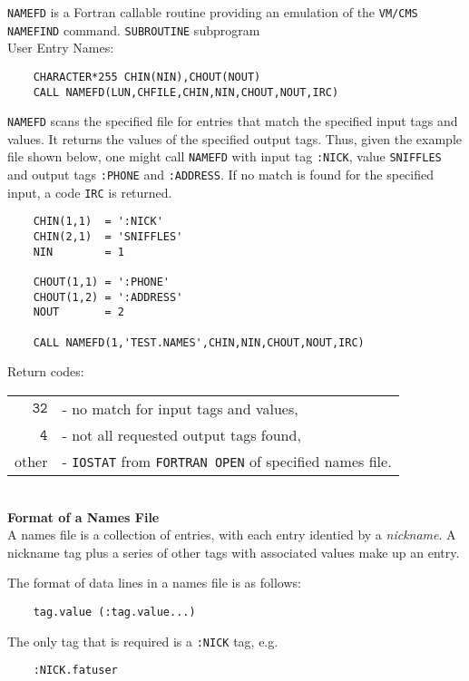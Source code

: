                     
                  
\Submitter{}                
{\tt NAMEFD} is a Fortran callable routine providing an emulation of
the {\tt VM/CMS NAMEFIND} command.
\Structure
{\tt SUBROUTINE} subprogram \\
User Entry Names: 
\Usage
\begin{verbatim}
    CHARACTER*255 CHIN(NIN),CHOUT(NOUT)
    CALL NAMEFD(LUN,CHFILE,CHIN,NIN,CHOUT,NOUT,IRC)
\end{verbatim}
{\tt NAMEFD} scans the specified file for entries that match the
specified input tags and values. It returns the values of the specified
output tags. Thus, given the example file shown below, one might call
{\tt NAMEFD} with input tag {\tt :NICK}, value {\tt SNIFFLES} and output
tags {\tt :PHONE} and {\tt :ADDRESS}. If no match is found for the
specified input, a code {\tt IRC} is returned.
\begin{verbatim}
    CHIN(1,1)  = ':NICK'
    CHIN(2,1)  = 'SNIFFLES'
    NIN        = 1
 
    CHOUT(1,1) = ':PHONE'
    CHOUT(1,2) = ':ADDRESS'
    NOUT       = 2
 
    CALL NAMEFD(1,'TEST.NAMES',CHIN,NIN,CHOUT,NOUT,IRC)
\end{verbatim}
Return codes:
\begin{tabular}[t]{rl}
$\mathtt{32}$ & - no match for input tags and values, \\
$\mathtt{\ 4}$ & - not all requested output tags found, \\
other & - {\tt IOSTAT} from {\tt FORTRAN OPEN} of specified names file.
\end{tabular}
\\[5mm]
{\bf Format of a Names File} \\[3mm]
A names file is a collection of entries, with each entry identied
by a {\it nickname}.  A nickname tag plus a series of other tags
with associated values make up an entry.
\par
The format of data lines in a names file is as follows:
\begin{verbatim}
    tag.value (:tag.value...)
\end{verbatim}
The only tag that is required is a {\tt :NICK} tag, e.g.
\begin{verbatim}
    :NICK.fatuser
\end{verbatim}
